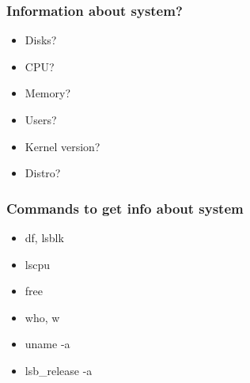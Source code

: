 \begin{frame}[fragile]
\frametitle{Information about system?}
    \begin{itemize}       
        \item Disks?
        \item CPU?
        \item Memory?
        \item Users?
        \item Kernel version?
        \item Distro?
    \end{itemize}
\end{frame}

\begin{frame}[fragile]
\frametitle{Commands to get info about system}
    \begin{itemize}       
        \item df, lsblk
        \item lscpu
        \item free
        \item who, w 
        \item uname -a 
        \item lsb\_release -a
    \end{itemize}
\end{frame}
